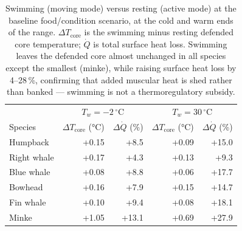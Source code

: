 \begin{table}[htbp]
\centering
\caption{Swimming (moving mode) versus resting (active mode) at the baseline food/condition scenario, at the cold and warm ends of the range. $\Delta T_{\mathrm{core}}$ is the swimming minus resting defended core temperature; $\dot{Q}$ is total surface heat loss. Swimming leaves the defended core almost unchanged in all species except the smallest (minke), while raising surface heat loss by 4--28\,\%, confirming that added muscular heat is shed rather than banked --- swimming is not a thermoregulatory subsidy.}
\label{tab:swimming}
\begin{tabular}{lrrrr}
\hline
& \multicolumn{2}{c}{$T_w=-2\,^\circ$C} & \multicolumn{2}{c}{$T_w=30\,^\circ$C} \\
Species & $\Delta T_{\mathrm{core}}$ (°C) & $\Delta\dot{Q}$ (\%) & $\Delta T_{\mathrm{core}}$ (°C) & $\Delta\dot{Q}$ (\%) \\
\hline
Humpback & +0.15 & +8.5 & +0.09 & +15.0 \\
Right whale & +0.17 & +4.3 & +0.13 & +9.3 \\
Blue whale & +0.08 & +8.8 & +0.06 & +17.7 \\
Bowhead & +0.16 & +7.9 & +0.15 & +14.7 \\
Fin whale & +0.10 & +9.4 & +0.08 & +18.1 \\
Minke & +1.05 & +13.1 & +0.69 & +27.9 \\
\hline
\end{tabular}
\end{table}
